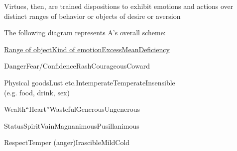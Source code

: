 \documentclass[11pt]{article}
\begin{document}
\noindent Virtues, then, are trained dispositions to exhibit emotions and actions over distinct ranges of behavior or objects of desire or aversion
\vspace*{2mm}

\noindent The following diagram represents A's overall scheme:
\vspace*{2mm}

\noindent\underline{Range of object\hspace*{10mm}Kind of emotion\hspace*{10mm}Excess\hspace*{17mm}Mean\hspace*{18mm}Deficiency}
\vspace*{1mm}

\noindent Danger\hspace*{22mm}Fear/Confidence\hspace*{10mm}Rash\hspace*{16mm}Courageous\hspace*{12mm}Coward
\vspace*{1mm}

\noindent Physical goods\hspace*{11mm}Lust etc.\hspace*{20mm}Intemperate\hspace*{8mm}Temperate\hspace*{13mm}Insensible\\\hspace*{2mm}(e.g. food, drink, sex)
\vspace*{1mm}

\noindent Wealth\hspace*{22mm}``Heart''\hspace*{22mm}Wasteful\hspace*{14mm}Generous\hspace*{12mm}Ungenerous
\vspace*{1mm}

\noindent Status\hspace*{24mm}Spirit\hspace*{27mm}Vain\hspace*{16mm}Magnanimous\hspace*{7mm}Pusillanimous
\vspace*{1mm}

\noindent Respect\hspace*{21mm}Temper (anger)\hspace*{11mm}Irascible\hspace*{16mm}Mild\hspace*{21mm}Cold
\vspace*{1mm}
\end{document}

